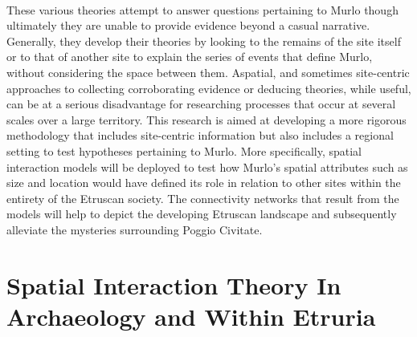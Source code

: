\documentclass[12pt,a4paper]{thesis}
\begin{document}
\paragraph{}	
These various theories attempt to answer questions pertaining to Murlo though ultimately they are unable to provide evidence beyond a casual narrative.  Generally, they develop their theories by looking to the remains of the site itself or to that of another site to explain the series of events that define Murlo, without considering the space between them. Aspatial, and sometimes site-centric approaches to collecting corroborating evidence or deducing theories, while useful, can be at a serious disadvantage for researching processes that occur at several scales over a large territory. This research is aimed at developing a more rigorous methodology that includes site-centric information but also includes a regional setting to test hypotheses pertaining to Murlo. More specifically, spatial interaction models will be deployed to test how Murlo's spatial attributes such as size and location would have defined its role in relation to other sites within the entirety of the Etruscan society.  The connectivity networks that result from the models will help to depict the developing Etruscan landscape and subsequently alleviate the mysteries surrounding Poggio Civitate.


\section{Spatial Interaction Theory In Archaeology and Within Etruria}
\end{document}
